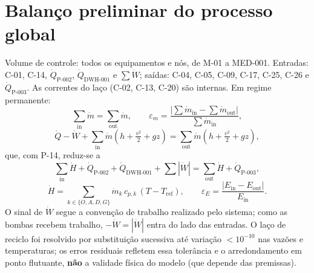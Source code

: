 \documentclass[11pt,a4paper]{article}
\numberwithin{equation}{section}
\numberwithin{table}{section}
\numberwithin{figure}{section}
\begin{document}
\section{Balanço preliminar do processo global}\label{sec:global}
Volume de controle: todos os equipamentos e nós, de M-01 a MED-001. Entradas: C-01, C-14, $\dot Q_{\mbox{P-002}}$, $\dot Q_{\mbox{DWH-001}}$ e $\sum\dot W$; saídas: C-04, C-05, C-09, C-17, C-25, C-26 e $\dot Q_{\mbox{P-003}}$. As correntes do laço (C-02, C-13, C-20) são internas. Em regime permanente:
\begin{equation}\label{eq:mglobal}
\sum_{\mathrm{in}}\dot m=\sum_{\mathrm{out}}\dot m,\qquad \varepsilon_m=\frac{\left|\sum\dot m_{\mathrm{in}}-\sum\dot m_{\mathrm{out}}\right|}{\sum\dot m_{\mathrm{in}}},
\end{equation}
\begin{equation}\label{eq:eglobal}
\dot Q-\dot W+\sum_{\mathrm{in}}\dot m\left(h+\tfrac{v^2}{2}+gz\right)=\sum_{\mathrm{out}}\dot m\left(h+\tfrac{v^2}{2}+gz\right),
\end{equation}
que, com P-14, reduz-se a
\begin{equation}\label{eq:eglobal2}
\sum_{\mathrm{in}}\dot H+\dot Q_{\mbox{P-002}}+\dot Q_{\mbox{DWH-001}}+\sum|\dot W|=\sum_{\mathrm{out}}\dot H+\dot Q_{\mbox{P-003}},
\end{equation}
\begin{equation}\label{eq:hsens}
\dot H=\sum_{k\in\{O,A,D,G\}}\dot m_k\,c_{p,k}\,(T-T_{\mathrm{ref}}),\qquad \varepsilon_E=\frac{\left|E_{\mathrm{in}}-E_{\mathrm{out}}\right|}{E_{\mathrm{in}}}.
\end{equation}
O sinal de $\dot W$ segue a convenção de trabalho realizado pelo sistema; como as bombas recebem trabalho, $-\dot W=|\dot W|$ entra do lado das entradas. O laço de reciclo foi resolvido por substituição sucessiva até variação $<10^{-10}$ nas vazões e temperaturas; os erros residuais refletem essa tolerância e o arredondamento em ponto flutuante, \textbf{não} a validade física do modelo (que depende das premissas).
\end{document}
